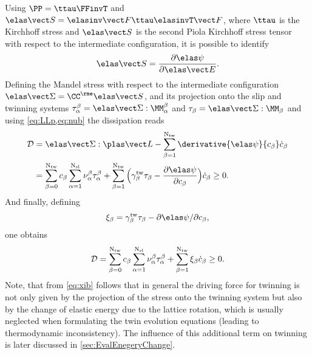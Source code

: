   Using $\PP = \ttau \FFinvT$ and $\SSe = \FFeinv \ttau \FFeinvT$, where $\ttau$ is the Kirchhoff stress and $\SSe$ is the second Piola Kirchhoff stress tensor with respect to the intermediate configuration, it is possible to identify
  \begin{equation}
    \SSe = \dpsieDEe.
    \label{eq:SSe}
  \end{equation}
  Defining the Mandel stress with respect to the intermediate configuration $\SSigmae=\CCe\SSe$, and its projection onto the slip and twinning systems $\tauab=\SSigmae:\MMab$ and $\taub = \SSigmae:\MMb$ and using \cref{eq:LLp,eq:nub} the dissipation reads
  \begin{equation}
      \begin{split}
      \diss &= \SSigmae : \LLp -\sumbI \derivative{\psie}{\cb}\cbdot \\
      &= \sumbO \cb \sumaI \nuab \tauab  + \sumbI \Big( \angleTwb \taub - \dpsieDcb \Big) \cbdot \geq 0.
      \end{split}
  \end{equation}
  And finally, defining 
  \begin{equation}
    \xib = \gammatwb\taub-\partial\psie/\partial\cb,
    \label{eq:xib}
  \end{equation}
  one obtains
  \begin{equation}
      \mathcal{D} = \sum_{\beta=0}^{{\rm N_{tw}}} c_{\beta} \sum_{\alpha=1}^{{\rm N_{sl}}} \nu_{\alpha}^{\beta} \tau_{\alpha}^{\beta} + \sum_{\beta=1}^{{\rm N_{tw}}} \xi_\beta \dot{c}_{\beta} \geq 0.
      \label{eq:redDiss}
  \end{equation}
  Note, that from \cref{eq:xib} follows that in general the driving force for twinning is not only given by the projection of the stress onto the twinning system but also by the change of elastic energy due to the lattice rotation, which is usually neglected when formulating the twin evolution equations (leading to thermodynamic inconsistency). The influence of this additional term on twinning is later discussed in \cref{sec:EvalEnegeryChange}.

